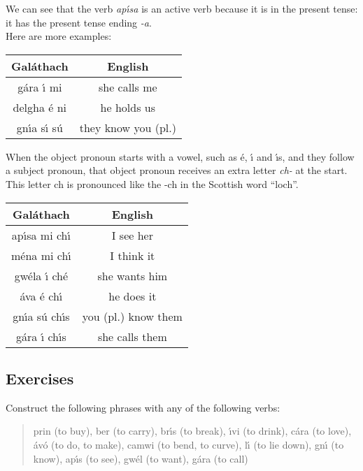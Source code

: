 \noindent We can see that the verb \textit{ap\'{\i}sa} is an active verb because it is in the present tense: it has the present tense ending \textit{-a}.\\

\noindent Here are more examples:
\begin{table}[H]
\centering
\begin{tabu}{c|c}
  \textbf{Gal\'{a}thach} & \textbf{English}\\
  \toprule
   g\'{a}ra \'{\i} mi & she calls me\\
   delgha \'{e} ni & he holds us\\
   gn\'{\i}a s\'{\i} s\'{u} & they know you (pl.)
\end{tabu}
\label{examples_verbs_vso_more_examples}
\end{table}

\noindent When the object pronoun starts with a vowel, such as \'{e}, \'{\i} and \'{\i}s, and they follow a subject pronoun, that object pronoun receives an extra letter \textit{ch-} at the start. This letter ch is pronounced like the -ch in the Scottish word ``loch''.
\begin{table}[H]
\centering
\begin{tabu}{c|c}
  \textbf{Gal\'{a}thach} & \textbf{English}\\
  \toprule
  ap\'{\i}sa mi ch\'{\i} & I see her\\
  m\'{e}na mi ch\'{\i} & I think it\\
  gw\'{e}la \'{\i} ch\'{e} & she wants him\\
  \'{a}va \'{e} ch\'{\i} & he does it\\
  gn\'{\i}a s\'{u} ch\'{\i}s & you (pl.) know them\\
  g\'{a}ra \'{\i} ch\'{\i}s & she calls them
\end{tabu}
\label{examples_verbs_vso_extra_ch}
\end{table}

\subsection{Exercises}

\noindent Construct the following phrases with any of the following verbs:\\

\begin{quote}
prin (to buy), ber (to carry), br\'{\i}s (to break), \'{\i}vi (to drink), c\'{a}ra (to love), \'{a}v\'{o} (to do, to make), camwi (to bend, to curve), l\'{\i} (to lie down), gn\'{\i} (to know), ap\'{\i}s (to see), gw\'{e}l (to want), g\'{a}ra (to call)
\end{quote}

